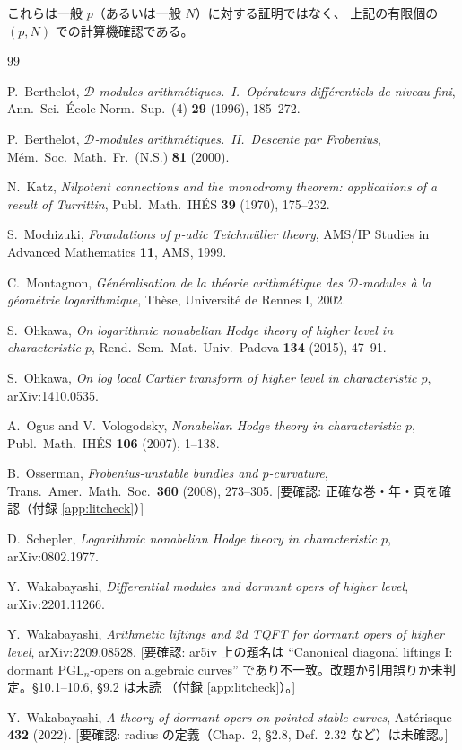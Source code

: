\documentclass[a4paper,11pt]{ltjsarticle}
\theoremstyle{plain}
\theoremstyle{definition}
\newcommand{\NeedsCheck}[1]{\textcolor{blue!70!black}{\textsf{[要確認: #1]}}}
\begin{document}
\medskip
\noindent これらは一般 $p$（あるいは一般 $N$）に対する証明ではなく、
上記の有限個の $(p,N)$ での計算機確認である。

\begin{thebibliography}{99}

 P.~Berthelot,
\emph{$\mathcal{D}$-modules arithmétiques.\ I.\ Opérateurs différentiels de niveau fini},
Ann.\ Sci.\ École Norm.\ Sup.\ (4) \textbf{29} (1996), 185--272.

 P.~Berthelot,
\emph{$\mathcal{D}$-modules arithmétiques.\ II.\ Descente par Frobenius},
Mém.\ Soc.\ Math.\ Fr.\ (N.S.) \textbf{81} (2000).

 N.~Katz,
\emph{Nilpotent connections and the monodromy theorem: applications of a result of Turrittin},
Publ.\ Math.\ IHÉS \textbf{39} (1970), 175--232.

 S.~Mochizuki,
\emph{Foundations of $p$-adic Teichmüller theory},
AMS/IP Studies in Advanced Mathematics \textbf{11}, AMS, 1999.

 C.~Montagnon,
\emph{Généralisation de la théorie arithmétique des $\mathcal{D}$-modules à la géométrie logarithmique},
Thèse, Université de Rennes I, 2002.

 S.~Ohkawa,
\emph{On logarithmic nonabelian Hodge theory of higher level in characteristic $p$},
Rend.\ Sem.\ Mat.\ Univ.\ Padova \textbf{134} (2015), 47--91.

 S.~Ohkawa,
\emph{On log local Cartier transform of higher level in characteristic $p$},
arXiv:1410.0535.

 A.~Ogus and V.~Vologodsky,
\emph{Nonabelian Hodge theory in characteristic $p$},
Publ.\ Math.\ IHÉS \textbf{106} (2007), 1--138.

 B.~Osserman,
\emph{Frobenius-unstable bundles and $p$-curvature},
Trans.\ Amer.\ Math.\ Soc.\ \textbf{360} (2008), 273--305.
\NeedsCheck{正確な巻・年・頁を確認（付録 \ref{app:litcheck}）}

 D.~Schepler,
\emph{Logarithmic nonabelian Hodge theory in characteristic $p$},
arXiv:0802.1977.

 Y.~Wakabayashi,
\emph{Differential modules and dormant opers of higher level},
arXiv:2201.11266.

 Y.~Wakabayashi,
\emph{Arithmetic liftings and 2d TQFT for dormant opers of higher level},
arXiv:2209.08528.
\NeedsCheck{ar5iv 上の題名は
``Canonical diagonal liftings I: dormant $\mathrm{PGL}_n$-opers on algebraic curves''
であり不一致。改題か引用誤りか未判定。\S10.1--10.6, \S9.2 は未読
（付録 \ref{app:litcheck}）。}

 Y.~Wakabayashi,
\emph{A theory of dormant opers on pointed stable curves},
Astérisque \textbf{432} (2022).
\NeedsCheck{radius の定義（Chap.~2, \S2.8, Def.~2.32 など）は未確認。}

\end{thebibliography}
\end{document}
